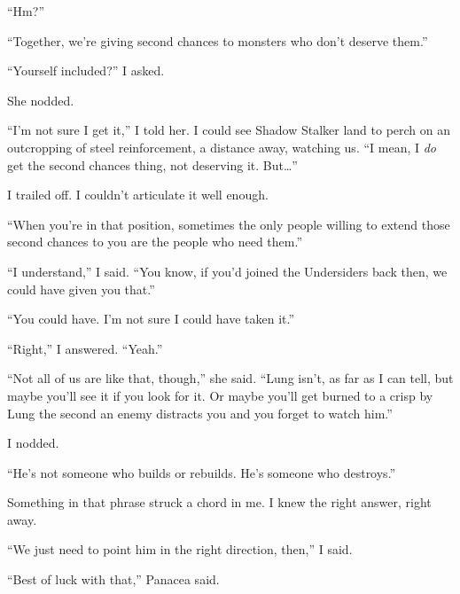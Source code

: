 ``Hm?''



``Together, we're giving second chances to monsters who don't deserve them.''



``Yourself included?'' I asked.



She nodded.



``I'm not sure I get it,'' I told her.  I could see Shadow Stalker land to perch on an outcropping of steel reinforcement, a distance away, watching us.  ``I mean, I \emph{do} get the second chances thing, not deserving it.  But\ldots''



I trailed off.  I couldn't articulate it well enough.



``When you're in that position, sometimes the only people willing to extend those second chances to you are the people who need them.''



``I understand,'' I said.  ``You know, if you'd joined the Undersiders back then, we could have given you that.''



``You could have.  I'm not sure I could have taken it.''



``Right,'' I answered.  ``Yeah.''



``Not all of us are like that, though,'' she said.  ``Lung isn't, as far as I can tell, but maybe you'll see it if you look for it.  Or maybe you'll get burned to a crisp by Lung the second an enemy distracts you and you forget to watch him.''



I nodded.



``He's not someone who builds or rebuilds.  He's someone who destroys.''



Something in that phrase struck a chord in me.  I knew the right answer, right away.



``We just need to point him in the right direction, then,'' I said.



``Best of luck with that,'' Panacea said.



